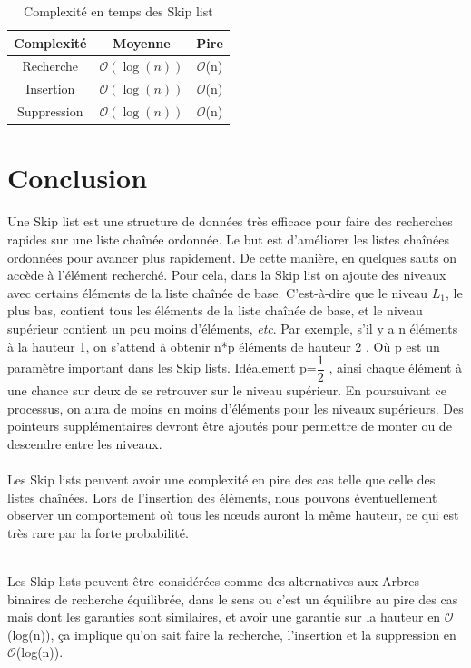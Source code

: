 \documentclass[hidelinks,a4paper,12pt]{article}
\begin{document}
\begin{table}[h]  
	\centering
	\begin{tabular}{|c|c|c|}
		\hline
		Complexité  		&  Moyenne       &  Pire          \\
		\hline
		Recherche   		& $\mathcal{O}(\log(n))$ &  $\mathcal{O}$(n)   \\	
		\hline
		Insertion   		& $\mathcal{O}(\log(n))$ &  $\mathcal{O}$(n)   \\	
		\hline
		Suppression 		& $\mathcal{O}(\log(n))$ &  $\mathcal{O}$(n)   \\	
		\hline
	\end{tabular}
	\caption{Complexité en temps des Skip list} 
	\label{table:mytable}
\end{table}


\newpage
\section{Conclusion}
Une Skip list est une structure de données très efficace pour faire des recherches rapides sur une liste chaînée ordonnée. Le but est d’améliorer les listes chaînées ordonnées pour avancer plus rapidement. De cette manière, en quelques sauts on accède à l’élément recherché. Pour cela, dans la Skip list on ajoute des niveaux avec certains éléments de la liste chaînée de base. C’est-à-dire que le niveau $L_{1}$, le plus bas, contient tous les éléments de la liste chaînée de base, et le niveau supérieur contient un peu moins d’éléments, \textit{etc}. Par exemple, s’il y a n éléments à la hauteur 1, on s’attend à obtenir n*p éléments de hauteur 2 \cite{ArticleZeratti}. Où p est un paramètre important dans les Skip lists. Idéalement p=$\dfrac{1}{2}$ \cite{ArticlePugh}, ainsi chaque élément à une chance sur deux de se retrouver sur le niveau supérieur. En poursuivant ce processus, on aura de moins en moins d’éléments pour les niveaux supérieurs. Des pointeurs supplémentaires devront être ajoutés pour permettre de monter ou de descendre entre les niveaux.
~\\~\\
Les Skip lists peuvent avoir une complexité en pire des cas telle que celle des listes chaînées. Lors de l’insertion des éléments, nous pouvons éventuellement observer un comportement où tous les nœuds auront la même hauteur, ce qui est très rare par la forte probabilité.

~\\
Les Skip lists peuvent être considérées comme des alternatives aux Arbres binaires de recherche équilibrée, dans le sens ou c'est un équilibre au pire des cas mais dont les garanties sont similaires, et avoir une garantie sur la hauteur en $\mathcal{O}$(log(n)), ça implique qu’on sait faire la recherche, l’insertion et la suppression en $\mathcal{O}$(log(n)).
\end{document}

